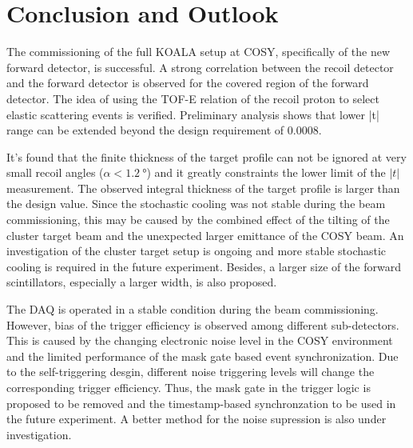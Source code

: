 \documentclass[number,5p]{elsarticle}
\begin{document}
\section{Conclusion and Outlook}
\label{sec:conclusion}

The commissioning of the full KOALA setup at COSY, specifically of the new forward detector, is successful.
A strong correlation between the recoil detector and the forward detector is
observed for the covered region of the forward detector.
The idea of using the TOF-E relation of the recoil proton to select elastic
scattering events is verified.
Preliminary analysis shows that lower |t| range can be extended beyond the design
requirement of \SI{0.0008}{\tmom}.

It's found that the finite thickness of the target profile can not be ignored at
very small recoil angles ($\alpha < \SI{1.2}{\degree}$) and it greatly
constraints the lower limit of the $|t|$ measurement.
The observed integral thickness of the target profile is larger than the design value.
Since the stochastic cooling was not stable during the beam commissioning, this may be caused by the combined effect of the tilting of the cluster target
beam and the unexpected larger emittance of the COSY beam.
An investigation of the cluster target setup is ongoing and more stable stochastic cooling is required in the future experiment.
Besides, a larger size of the forward scintillators, especially a larger width, is also proposed.

The DAQ is operated in a stable condition during the beam commissioning.
However, bias of the trigger efficiency is observed among different sub-detectors.
This is caused by the changing electronic noise level in the COSY environment
and the limited performance of the mask gate based event synchronization.
Due to the self-triggering desgin, different noise triggering levels will change the corresponding trigger efficiency.
Thus, the mask gate in the trigger logic is proposed to be removed and the timestamp-based synchronzation to be used in the future experiment.
A better method for the noise supression is also under investigation.



\end{document}
